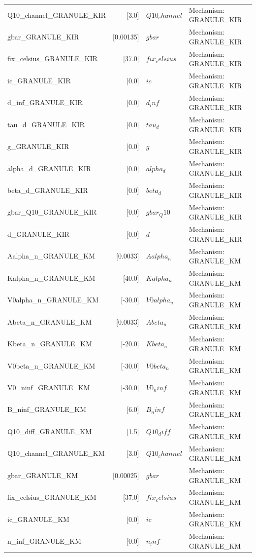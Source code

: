 \begin{tabular}{|l|r|l|l|}
Q10_channel_GRANULE_KIR & [3.0] & $Q10_channel$ & Mechanism: GRANULE_KIR \\
gbar_GRANULE_KIR & [0.00135] & $gbar$ & Mechanism: GRANULE_KIR \\
fix_celsius_GRANULE_KIR & [37.0] & $fix_celsius$ & Mechanism: GRANULE_KIR \\
ic_GRANULE_KIR & [0.0] & $ic$ & Mechanism: GRANULE_KIR \\
d_inf_GRANULE_KIR & [0.0] & $d_inf$ & Mechanism: GRANULE_KIR \\
tau_d_GRANULE_KIR & [0.0] & $tau_d$ & Mechanism: GRANULE_KIR \\
g_GRANULE_KIR & [0.0] & $g$ & Mechanism: GRANULE_KIR \\
alpha_d_GRANULE_KIR & [0.0] & $alpha_d$ & Mechanism: GRANULE_KIR \\
beta_d_GRANULE_KIR & [0.0] & $beta_d$ & Mechanism: GRANULE_KIR \\
gbar_Q10_GRANULE_KIR & [0.0] & $gbar_Q10$ & Mechanism: GRANULE_KIR \\
d_GRANULE_KIR & [0.0] & $d$ & Mechanism: GRANULE_KIR \\
Aalpha_n_GRANULE_KM & [0.0033] & $Aalpha_n$ & Mechanism: GRANULE_KM \\
Kalpha_n_GRANULE_KM & [40.0] & $Kalpha_n$ & Mechanism: GRANULE_KM \\
V0alpha_n_GRANULE_KM & [-30.0] & $V0alpha_n$ & Mechanism: GRANULE_KM \\
Abeta_n_GRANULE_KM & [0.0033] & $Abeta_n$ & Mechanism: GRANULE_KM \\
Kbeta_n_GRANULE_KM & [-20.0] & $Kbeta_n$ & Mechanism: GRANULE_KM \\
V0beta_n_GRANULE_KM & [-30.0] & $V0beta_n$ & Mechanism: GRANULE_KM \\
V0_ninf_GRANULE_KM & [-30.0] & $V0_ninf$ & Mechanism: GRANULE_KM \\
B_ninf_GRANULE_KM & [6.0] & $B_ninf$ & Mechanism: GRANULE_KM \\
Q10_diff_GRANULE_KM & [1.5] & $Q10_diff$ & Mechanism: GRANULE_KM \\
Q10_channel_GRANULE_KM & [3.0] & $Q10_channel$ & Mechanism: GRANULE_KM \\
gbar_GRANULE_KM & [0.00025] & $gbar$ & Mechanism: GRANULE_KM \\
fix_celsius_GRANULE_KM & [37.0] & $fix_celsius$ & Mechanism: GRANULE_KM \\
ic_GRANULE_KM & [0.0] & $ic$ & Mechanism: GRANULE_KM \\
n_inf_GRANULE_KM & [0.0] & $n_inf$ & Mechanism: GRANULE_KM \\

\end{tabular}

